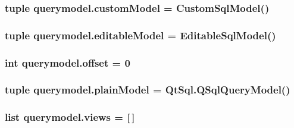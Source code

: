 \subsubsection[{custom\+Model}]{\setlength{\rightskip}{0pt plus 5cm}tuple querymodel.\+custom\+Model = {\bf Custom\+Sql\+Model}()}\label{namespacequerymodel_a89f57f5a4c16271b8761a2a145be137a}
\hypertarget{namespacequerymodel_a0f8993806a307a2b593d08a0c1532a32}{}
\subsubsection[{editable\+Model}]{\setlength{\rightskip}{0pt plus 5cm}tuple querymodel.\+editable\+Model = {\bf Editable\+Sql\+Model}()}\label{namespacequerymodel_a0f8993806a307a2b593d08a0c1532a32}
\hypertarget{namespacequerymodel_ac45d0851fc0f5e83a417b032bceacf19}{}
\subsubsection[{offset}]{\setlength{\rightskip}{0pt plus 5cm}int querymodel.\+offset = 0}\label{namespacequerymodel_ac45d0851fc0f5e83a417b032bceacf19}
\hypertarget{namespacequerymodel_ab8b7e48d94239f4788a9a34086c56176}{}
\subsubsection[{plain\+Model}]{\setlength{\rightskip}{0pt plus 5cm}tuple querymodel.\+plain\+Model = Qt\+Sql.\+Q\+Sql\+Query\+Model()}\label{namespacequerymodel_ab8b7e48d94239f4788a9a34086c56176}
\hypertarget{namespacequerymodel_a245bcf56ff01541c0ed0f1004daabb2e}{}
\subsubsection[{views}]{\setlength{\rightskip}{0pt plus 5cm}list querymodel.\+views = \mbox{[}$\,$\mbox{]}}\label{namespacequerymodel_a245bcf56ff01541c0ed0f1004daabb2e}
